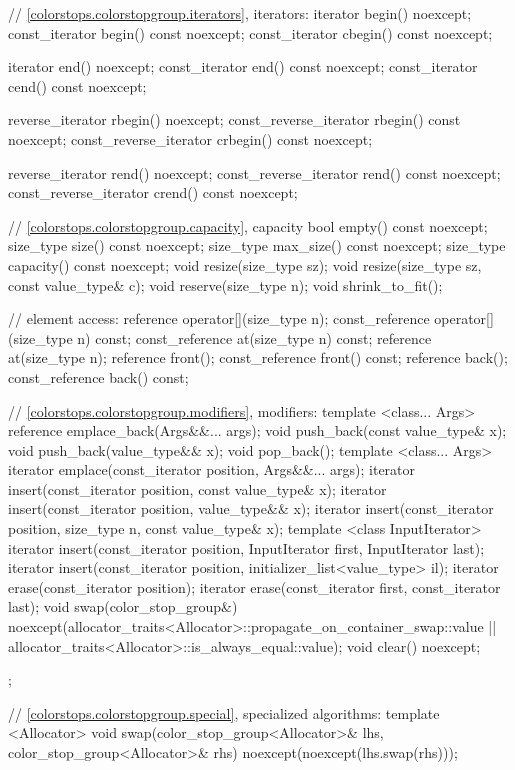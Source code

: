 \begin{codeblock}
{{{{{    // \ref{colorstops.colorstopgroup.iterators}, iterators:
    iterator begin() noexcept;
    const_iterator begin() const noexcept;
    const_iterator cbegin() const noexcept;
    
    iterator end() noexcept;
    const_iterator end() const noexcept;
    const_iterator cend() const noexcept;
    
    reverse_iterator rbegin() noexcept;
    const_reverse_iterator rbegin() const noexcept;
    const_reverse_iterator crbegin() const noexcept;
    
    reverse_iterator rend() noexcept;
    const_reverse_iterator rend() const noexcept;
    const_reverse_iterator crend() const noexcept;
    
    // \ref{colorstops.colorstopgroup.capacity}, capacity
    bool empty() const noexcept;
    size_type size() const noexcept;
    size_type max_size() const noexcept;
    size_type capacity() const noexcept;
    void resize(size_type sz);
    void resize(size_type sz, const value_type& c);
    void reserve(size_type n);
    void shrink_to_fit();
    
    // element access:
    reference operator[](size_type n);
    const_reference operator[](size_type n) const;
    const_reference at(size_type n) const;
    reference at(size_type n);
    reference front();
    const_reference front() const;
    reference back();
    const_reference back() const;
    
    // \ref{colorstops.colorstopgroup.modifiers}, modifiers:
    template <class... Args>
    reference emplace_back(Args&&... args);
    void push_back(const value_type& x);
    void push_back(value_type&& x);
    void pop_back();
    template <class... Args>
    iterator emplace(const_iterator position, Args&&... args);
    iterator insert(const_iterator position, const value_type& x);
    iterator insert(const_iterator position, value_type&& x);
    iterator insert(const_iterator position, size_type n, const value_type& x);
    template <class InputIterator>
    iterator insert(const_iterator position, InputIterator first,
      InputIterator last);
    iterator insert(const_iterator position,
    initializer_list<value_type> il);
    iterator erase(const_iterator position);
    iterator erase(const_iterator first, const_iterator last);
    void swap(color_stop_group&)
      noexcept(allocator_traits<Allocator>::propagate_on_container_swap::value 
      || allocator_traits<Allocator>::is_always_equal::value);
    void clear() noexcept;
  };

  // \ref{colorstops.colorstopgroup.special}, specialized algorithms:
  template <Allocator>
  void swap(color_stop_group<Allocator>& lhs, color_stop_group<Allocator>& rhs)
    noexcept(noexcept(lhs.swap(rhs)));
} } } }
\end{codeblock}

